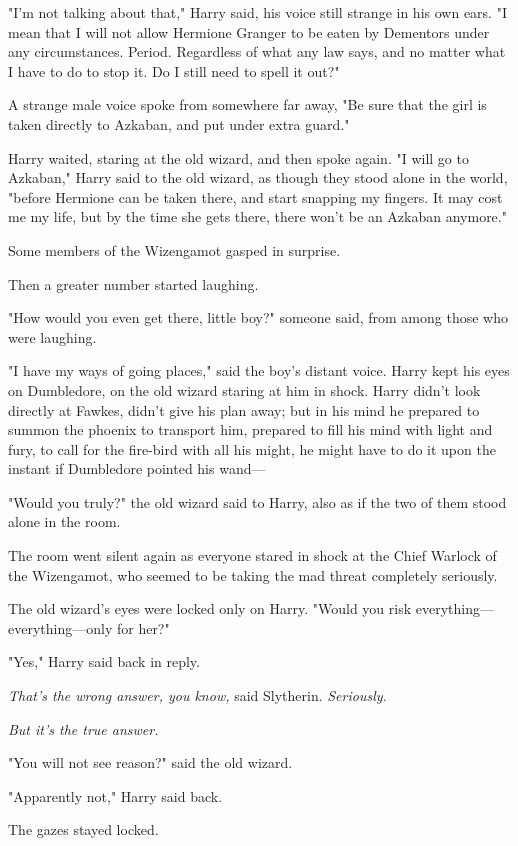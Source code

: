 "I'm not talking about that," Harry said, his voice still strange in his own
ears. "I mean that I will not allow Hermione Granger to be eaten by Dementors
under any circumstances. Period. Regardless of what any law says, and no matter
what I have to do to stop it. Do I still need to spell it out?"

A strange male voice spoke from somewhere far away, "Be sure that the girl is
taken directly to Azkaban, and put under extra guard."

Harry waited, staring at the old wizard, and then spoke again. "I will go to
Azkaban," Harry said to the old wizard, as though they stood alone in the
world, "before Hermione can be taken there, and start snapping my fingers. It
may cost me my life, but by the time she gets there, there won't be an Azkaban
anymore."

Some members of the Wizengamot gasped in surprise.

Then a greater number started laughing.

"How would you even get there, little boy?" someone said, from among those who
were laughing.

"I have my ways of going places," said the boy's distant voice. Harry kept his
eyes on Dumbledore, on the old wizard staring at him in shock. Harry didn't
look directly at Fawkes, didn't give his plan away; but in his mind he prepared
to summon the phoenix to transport him, prepared to fill his mind with light
and fury, to call for the fire-bird with all his might, he might have to do it
upon the instant if Dumbledore pointed his wand---

"Would you truly?" the old wizard said to Harry, also as if the two of them
stood alone in the room.

The room went silent again as everyone stared in shock at the Chief Warlock of
the Wizengamot, who seemed to be taking the mad threat completely seriously.

The old wizard's eyes were locked only on Harry. "Would you risk
everything---everything---only for her?"

"Yes," Harry said back in reply.

\emph{That's the wrong answer, you know,} said Slytherin. \emph{Seriously.}

\emph{But it's the true answer.}

"You will not see reason?" said the old wizard.

"Apparently not," Harry said back.

The gazes stayed locked.

